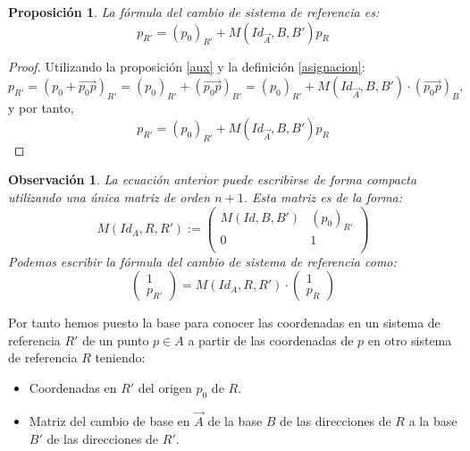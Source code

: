 \documentclass[a4paper,11pt, oneside]{book}
\newtheorem{prop}{Proposición}
\newtheorem{obv}{Observación}
\begin{document}
\begin{prop}
		La fórmula del cambio de sistema de referencia es:
	\begin{equation}
		p_{R'} = (p_0)_{R'} + M(Id_{\overrightarrow{A}}, B, B')p_R
	\end{equation}
\end{prop}
\begin{proof}
	Utilizando la proposición \ref{aux} y la definición \ref{asignacion}:
	\begin{equation}
	p_{R'} = (p_0 + \overrightarrow{p_0p})_{R'} = (p_0)_{R'} + (\overrightarrow{p_{0}p})_{B'} = (p_0)_{R'} + M(Id_{\overrightarrow{A}}, B, B') \cdot  (\overrightarrow{p_0p})_B,
	\end{equation}
	y por tanto,
	\begin{equation}
	p_{R'} = (p_0)_{R'} + M(Id_{\overrightarrow{A}}, B, B')p_R
	\end{equation}
\end{proof}

\begin{obv}
La ecuación anterior puede escribirse de forma compacta utilizando una única matriz de orden $n+1$. Esta matriz es de la forma:
\begin{equation}
M(Id_A, R, R') := 
\begin{pmatrix}
M(Id, B, B') & (p_0)_{R'} \\
0 			 & 1 \\
\end{pmatrix}
\end{equation}
Podemos escribir la fórmula del cambio de sistema de referencia como:
\begin{equation}\label{cambio}
\begin{pmatrix}
1 \\
p_{R'}
\end{pmatrix}
 = M(Id_A, R, R')\cdot \begin{pmatrix}
 1 \\
 p_R
 \end{pmatrix}
\end{equation}
\end{obv}

Por tanto hemos puesto la base para conocer las coordenadas en un sistema de referencia $R'$ de un punto $p \in A$ a partir de las coordenadas de $p$ en otro sistema de referencia $R$ teniendo:
\begin{itemize}
	\item Coordenadas en $R'$ del origen $p_0$ de $R$.
	\item Matriz del cambio de base en $\overrightarrow{A}$ de la base $B$ de las direcciones de $R$ a la base $B'$ de las direcciones de $R'$.
\end{itemize}
\end{document}

